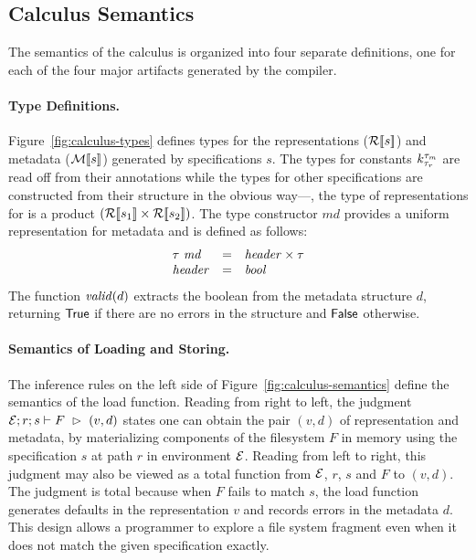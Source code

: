 \subsection{Calculus Semantics}
%
The semantics of the calculus is organized into four separate
definitions, one for each of the four major artifacts generated by the
\forest{} compiler.

\paragraph*{Type Definitions.}
Figure~\ref{fig:calculus-types} defines types for the representations
($\repty{s}$) and metadata ($\mdty{s}$) generated by specifications
$s$. The types for constants $\Sk$ are read off from their annotations
while the types for other specifications are constructed from their
structure in the obvious way---\eg, the type of representations for
 is a product $(\repty{s_1} \times
\repty{s_2})$. The type constructor $\mathit{md}$ provides a uniform
representation for metadata and is defined as follows:
\[
\begin{array}{lcl}
\tau~\mathit{md} & = & \typ{header} \times \tau \\
\typ{header} & = & \typ{bool} 
\end{array}
\]
The function $\valid{d}$ extracts the boolean from the metadata
structure $d$, returning $\True$ if there are no errors in the
structure and $\False$ otherwise. 

\paragraph*{Semantics of Loading and Storing.}
The inference rules on the left side of
Figure~\ref{fig:calculus-semantics} define the semantics of the load
function. Reading from right to left, the judgment 
$\load{\Env}{F}{r}{s}{v,d}$ states one can obtain the pair $(v,d)$ of
representation and metadata, by materializing components
of the filesystem $F$ in memory using the specification $s$
at path $r$ in environment $\Env$.  Reading from
left to right, this judgment may also be viewed
as a total function from $\Env$, $r$, $s$ and $F$ to $(v,d)$. The
judgment is total because when $F$ fails to match $s$, the load
function generates defaults in the representation $v$ and records
errors in the metadata $d$.  This design allows a programmer to
explore a file system fragment even when it does not match the
given specification exactly.

